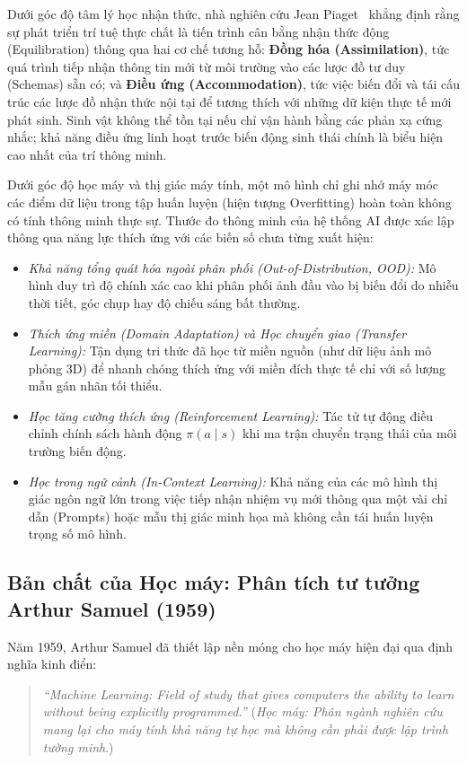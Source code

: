 Dưới góc độ tâm lý học nhận thức, nhà nghiên cứu Jean Piaget~\citep{week2_piaget1947} khẳng định rằng sự phát triển trí tuệ thực chất là tiến trình cân bằng nhận thức động (Equilibration) thông qua hai cơ chế tương hỗ: \textbf{Đồng hóa (Assimilation)}, tức quá trình tiếp nhận thông tin mới từ môi trường vào các lược đồ tư duy (Schemas) sẵn có; và \textbf{Điều ứng (Accommodation)}, tức việc biến đổi và tái cấu trúc các lược đồ nhận thức nội tại để tương thích với những dữ kiện thực tế mới phát sinh. Sinh vật không thể tồn tại nếu chỉ vận hành bằng các phản xạ cứng nhắc; khả năng điều ứng linh hoạt trước biến động sinh thái chính là biểu hiện cao nhất của trí thông minh.

Dưới góc độ học máy và thị giác máy tính, một mô hình chỉ ghi nhớ máy móc các điểm dữ liệu trong tập huấn luyện (hiện tượng Overfitting) hoàn toàn không có tính thông minh thực sự. Thước đo thông minh của hệ thống AI được xác lập thông qua năng lực thích ứng với các biến số chưa từng xuất hiện:
\begin{itemize}
    \item \textit{Khả năng tổng quát hóa ngoài phân phối (Out-of-Distribution, OOD):} Mô hình duy trì độ chính xác cao khi phân phối ảnh đầu vào bị biến đổi do nhiễu thời tiết, góc chụp hay độ chiếu sáng bất thường.
    \item \textit{Thích ứng miền (Domain Adaptation) và Học chuyển giao (Transfer Learning):} Tận dụng tri thức đã học từ miền nguồn (như dữ liệu ảnh mô phỏng 3D) để nhanh chóng thích ứng với miền đích thực tế chỉ với số lượng mẫu gán nhãn tối thiểu.
    \item \textit{Học tăng cường thích ứng (Reinforcement Learning):} Tác tử tự động điều chỉnh chính sách hành động $\pi(a \mid s)$ khi ma trận chuyển trạng thái của môi trường biến động.
    \item \textit{Học trong ngữ cảnh (In-Context Learning):} Khả năng của các mô hình thị giác ngôn ngữ lớn trong việc tiếp nhận nhiệm vụ mới thông qua một vài chỉ dẫn (Prompts) hoặc mẫu thị giác minh họa mà không cần tái huấn luyện trọng số mô hình.
\end{itemize}

\subsection{Bản chất của Học máy: Phân tích tư tưởng Arthur Samuel (1959)}

Năm 1959, Arthur Samuel đã thiết lập nền móng cho học máy hiện đại qua định nghĩa kinh điển:
\begin{quote}
\textit{``Machine Learning: Field of study that gives computers the ability to learn without being explicitly programmed.''} (\textit{Học máy: Phân ngành nghiên cứu mang lại cho máy tính khả năng tự học mà không cần phải được lập trình tường minh}.)
\end{quote}

